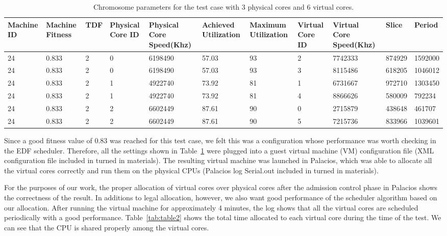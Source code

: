 \documentclass[11pt]{article}
\begin{document}
\begin{table}[H]
\centering
\begin{footnotesize}
\renewcommand{\arraystretch}{1.2}

 \begin{tabularx}{\textwidth}{ | X | X | X | X | X | X | X | X | X | X | X |}
 \hline
Machine ID & Machine Fitness & TDF  & Physical Core ID & Physical Core Speed(Khz) & Achieved Utilization & Maximum Utilization & Virtual Core ID & Virtual Core Speed(Khz) & Slice & Period \\ \hline

24 & 0.833 & 2 & 0 & 6198490 & 57.03 & 93 & 2 & 7742333 & 874929 & 1592000 \\ \hline
24 & 0.833 & 2 & 0 & 6198490 & 57.03 & 93 & 3 & 8115486 & 618205 & 1046012 \\ \hline

24 & 0.833 & 2 & 1 & 4922740 & 73.92 & 81 & 1 & 6731667 & 972710 & 1303450 \\ \hline
24 & 0.833 & 2 & 1 & 4922740 & 73.92 & 81 & 4 & 8866626 & 580009 & 792234 \\ \hline

24 & 0.833 & 2 & 2 & 6602449 & 87.61 & 90 & 0 & 2715879 & 438648 & 461707 \\ \hline
24 & 0.833 & 2 & 2 & 6602449 & 87.61 & 90 & 5 & 7215736 & 833966 & 1039601 \\ \hline

\end{tabularx}
\caption{Chromosome parameters for the test case with 3 physical cores and 6 virtual cores.} \label{tab:table1}
\end{footnotesize}
\end{table}

Since a good fitness value of 0.83 was reached for this test case, we felt this was a configuration whose performance was worth checking in the EDF scheduler. Therefore, all the settings shown in Table~\ref{tab:table1} were plugged into a guest virtual machine (VM) configuration file (XML configuration file included in turned in materials). The resulting virtual machine was launched in Palacios, which was able to allocate all the virtual cores correctly and run them on the physical CPUs (Palacios log Serial.out included in turned in materials). 

For the purposes of our work, the proper allocation of virtual cores over physical cores after the admission control phase in Palacios shows the correctness of the result. In additions to legal allocation, however, we also want good performance of the scheduler algorithm based on our allocation. After running the virtual machine for approximately 4 minutes, the log shows that all the virtual cores are scheduled periodically with a good performance. Table~\ref{tab:table2} shows the total time allocated to each virtual core during the time of the test. We can see that the CPU is shared properly among the virtual cores.
\end{document}
